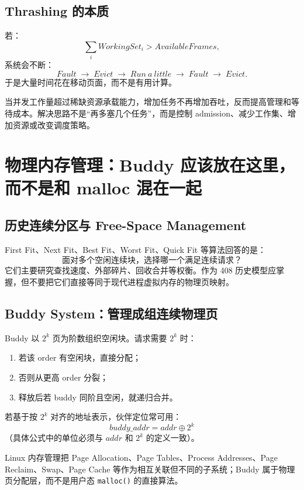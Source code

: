 \documentclass[11pt,a4paper]{ctexart}
\newcommand{\code}[1]{\texttt{#1}}
\newcommand{\arr}{\;\longrightarrow\;}
\begin{document}
\subsection{Thrashing 的本质}
若：
\[
\sum_i WorkingSet_i > AvailableFrames,
\]
系统会不断：
\[
Fault\arr Evict\arr Run\ a\ little\arr Fault\arr Evict.
\]
于是大量时间花在移动页面，而不是有用计算。

\begin{bridge}
当并发工作量超过稀缺资源承载能力，增加任务不再增加吞吐，反而提高管理和等待成本。解决思路不是“再多塞几个任务”，而是控制 admission、减少工作集、增加资源或改变调度策略。
\end{bridge}

\section{物理内存管理：Buddy 应该放在这里，而不是和 malloc 混在一起}

\subsection{历史连续分区与 Free-Space Management}
First Fit、Next Fit、Best Fit、Worst Fit、Quick Fit 等算法回答的是：
\[
\boxed{\text{面对多个空闲连续块，选择哪一个满足连续请求？}}
\]
它们主要研究查找速度、外部碎片、回收合并等权衡。作为 408 历史模型应掌握，但不要把它们直接等同于现代进程虚拟内存的物理页映射。

\subsection{Buddy System：管理成组连续物理页}
Buddy 以 $2^k$ 页为阶数组织空闲块。请求需要 $2^k$ 时：
\begin{enumerate}
  \item 若该 order 有空闲块，直接分配；
  \item 否则从更高 order 分裂；
  \item 释放后若 buddy 同阶且空闲，就递归合并。
\end{enumerate}
若基于按 $2^k$ 对齐的地址表示，伙伴定位常可用：
\[
\boxed{buddy\_addr = addr \oplus 2^k}
\]
（具体公式中的单位必须与 $addr$ 和 $2^k$ 的定义一致）。

\begin{eng}[工程定位]
Linux 内存管理把 Page Allocation、Page Tables、Process Addresses、Page Reclaim、Swap、Page Cache 等作为相互关联但不同的子系统；Buddy 属于物理页分配层，而不是用户态 \code{malloc()} 的直接算法。
\end{eng}
\end{document}
